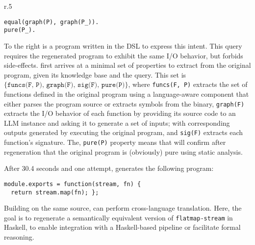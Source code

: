\documentclass[a4paper,twoside,12pt]{report} %
\begin{document}
\begin{wrapfigure}[3]{r}{.5\columnwidth}
\vspace{-10pt}
\begin{verbatim}
equal(graph(P), graph(P_)).
pure(P_).
\end{verbatim}
\end{wrapfigure}
To the right is a program written in the \sys DSL to express this intent.
This query requires the regenerated program  to exhibit the same I/O behavior,
but forbids side-effects.
\sys first arrives at a minimal set of properties to extract from the
original program, given its knowledge base and the query.
This set is $\{\texttt{funcs(F, P), graph(F), sig(F), pure(P)}\}$, where
\texttt{funcs(F, P)} extracts the set of functions defined in the original program
using a language-aware component that either parses the program source or extracts
symbols from the binary,
\texttt{graph(F)} extracts the I/O behavior of each function
by providing its source code to an LLM instance and asking it to generate a set of
inputs; with corresponding outputs generated by executing the original program,
and \texttt{sig(F)} extracts each function's signature.
The, \texttt{pure(P)} property means that \sys will confirm after regeneration that the original program is (obviously) pure
using static analysis.

After 30.4 seconds and one attempt, \sys generates the following program:
\begin{verbatim}
module.exports = function(stream, fn) {
  return stream.map(fn); };
\end{verbatim}


Building on the same source, \sys can perform cross-language
translation. 
Here, the goal is to regenerate a semantically equivalent version
of \texttt{flatmap-stream} in Haskell, to enable integration with a
Haskell-based pipeline or facilitate formal reasoning.
\end{document}
